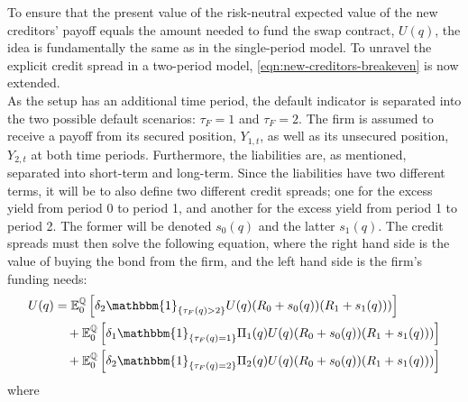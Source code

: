 \documentclass[main.tex]{subfiles}
\begin{document}
        To ensure that the present value of the risk-neutral expected value of the new creditors' payoff equals the amount needed to fund the swap contract, $U(q)$,
        the idea is fundamentally the same as in the single-period model.
        To unravel the explicit credit spread in a two-period model,
        \cref{eqn:new-creditors-breakeven} is now extended.
        \\
        As the setup has an additional time period, the default indicator is separated into the two possible default scenarios:
        $\tau_F = 1$ and $\tau_F = 2$.
        The firm is assumed to receive a payoff from its secured position, $Y_{1,t}$, as well as its unsecured position, $Y_{2,t}$ at both time periods.
        Furthermore, the liabilities are, as mentioned, separated into short-term and long-term.
        Since the liabilities have two different terms, 
        it will be to also define two different credit spreads;
        one for the excess yield from period 0 to period 1,
        and another for the excess yield from period 1 to period 2.
        The former will be denoted $s_{0}(q)$ and the latter $s_{1}(q)$.
        The credit spreads must then solve the following equation,
        where the right hand side is the value of buying the bond from the firm,
        and the left hand side is the firm's funding needs:
        \begin{align}
            U(q)
            &=
                \mathbb{E}_{0}^{\rnmeasure}\left[
                    \delta_2
                    \mathbbm{1}_{\{\tau_{F}(q)>2\}}
                    U(q)
                    (R_{0} + s_{0}(q))(R_{1} + s_{1}(q)))
                \right]
            \nonumber
            \\
            &\quad+ \mathbb{E}_{0}^{\rnmeasure}
            \left[
                \delta_1\mathbbm{1}_{\{\tau_{F}(q)=1\}} \Pi_1(q) U(q)(R_{0} + s_{0}(q))(R_{1} + s_{1}(q)))
            \right]
            \nonumber
            \\
            &\quad+ \mathbb{E}_{0}^{\rnmeasure}
            \left[
                \delta_2\mathbbm{1}_{\{\tau_{F}(q)=2\}} \Pi_2(q) U(q)(R_{0} + s_{0}(q))(R_{1} + s_{1}(q)))
            \right]
            \label{eqn:new-creditors-breakeven-two-period-model}
        \end{align}
        where
\end{document}
